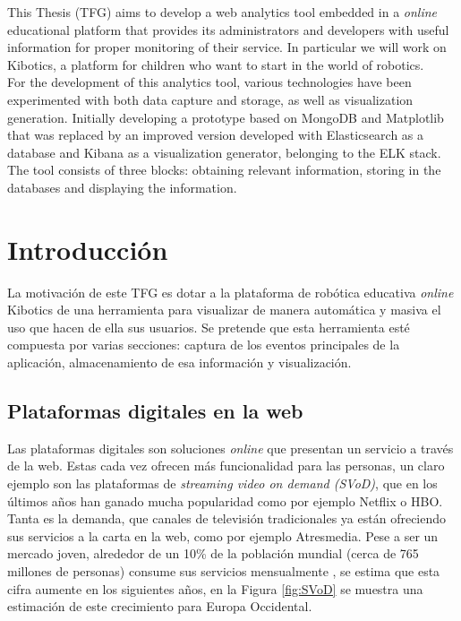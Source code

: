 \documentclass[a4paper, 12pt]{book}
\begin{document}
		This Thesis (TFG) aims to develop a web analytics tool embedded in a \textit{online} educational platform that provides its administrators and developers with useful information for proper monitoring of their service. In particular we will work on Kibotics, a platform for children who want to start in the world of robotics. \\
		
		For the development of this analytics tool, various technologies have been experimented with both data capture and storage, as well as visualization generation. Initially developing a prototype based on MongoDB and Matplotlib that was replaced by an improved version developed with Elasticsearch as a database and Kibana as a visualization generator, belonging to the ELK stack. The tool consists of three blocks: obtaining relevant information, storing in the databases and displaying the information.\\

	\tableofcontents 

	\cleardoublepage
	
	\listoffigures 
		
	\cleardoublepage
	\chapter{Introducción}
	\label{chap:introduccion} 
	
		La motivación de este TFG es dotar a la plataforma de robótica educativa \textit{online} Kibotics de una herramienta para visualizar de manera automática y masiva el uso que hacen de ella sus usuarios. Se pretende que esta herramienta esté compuesta por varias secciones: captura de los eventos principales de la aplicación, almacenamiento de esa información y visualización.
		
	\section{Plataformas digitales en la web}
	\label{sec:plataformas_digitales_web}
		Las plataformas digitales son soluciones \textit{online} que presentan un servicio a través de la web. Estas cada vez ofrecen más funcionalidad para las personas, un claro ejemplo son las plataformas de \textit{streaming video on demand (SVoD)}, que en los últimos años han ganado mucha popularidad como por ejemplo Netflix o HBO. Tanta es la demanda, que canales de televisión tradicionales ya están ofreciendo sus servicios a la carta en la web, como por ejemplo Atresmedia. Pese a ser un mercado joven, alrededor de un 10\% de la población mundial (cerca de 765 millones de personas) consume sus servicios mensualmente \cite{SVod}, se estima que esta cifra aumente en los siguientes años, en la Figura \ref{fig:SVoD} se muestra una estimación de este crecimiento para Europa Occidental.\\
		
\end{document}
